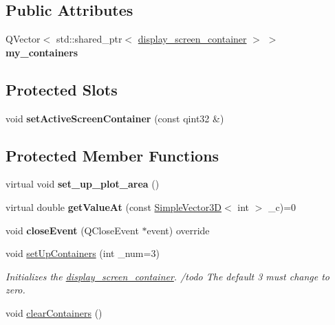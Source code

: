 \subsection*{Public Attributes}
\begin{DoxyCompactItemize}
\item 
\mbox{\label{classScreen__manager_ad20150bef59ac873d47c7dccb5062258}} 
Q\+Vector$<$ std\+::shared\+\_\+ptr$<$ \mbox{\hyperlink{classdisplay__screen__container}{display\+\_\+screen\+\_\+container}} $>$ $>$ {\bfseries my\+\_\+containers}
\end{DoxyCompactItemize}
\subsection*{Protected Slots}
\begin{DoxyCompactItemize}
\item 
\mbox{\label{classScreen__manager_a9f814711fe49f63a404758ffb39f63cc}} 
void {\bfseries set\+Active\+Screen\+Container} (const qint32 \&)
\end{DoxyCompactItemize}
\subsection*{Protected Member Functions}
\begin{DoxyCompactItemize}
\item 
\mbox{\label{classScreen__manager_a8285b74dd2913a8368aebb8c4aeccee1}} 
virtual void {\bfseries set\+\_\+up\+\_\+plot\+\_\+area} ()
\item 
\mbox{\label{classScreen__manager_a5f8b8efd36388e8d60a1c5d78d458b2d}} 
virtual double {\bfseries get\+Value\+At} (const \mbox{\hyperlink{classViewer_1_1SimpleVector3D}{Simple\+Vector3D}}$<$ int $>$ \+\_\+c)=0
\item 
\mbox{\label{classScreen__manager_a1e77461fc2c621a338131d25efa28e7a}} 
void {\bfseries close\+Event} (Q\+Close\+Event $\ast$event) override
\item 
\mbox{\label{classScreen__manager_ae999da71a66db6ce0ce62216fe20863a}} 
void \mbox{\hyperlink{classScreen__manager_ae999da71a66db6ce0ce62216fe20863a}{set\+Up\+Containers}} (int \+\_\+num=3)
\begin{DoxyCompactList}\small\item\em Initializes the \mbox{\hyperlink{classdisplay__screen__container}{display\+\_\+screen\+\_\+container}}. /todo The default 3 must change to zero. \end{DoxyCompactList}\item 
void \mbox{\hyperlink{classScreen__manager_a5896c354d45b0b4142a76b26f7081787}{clear\+Containers}} ()
\end{DoxyCompactItemize}
